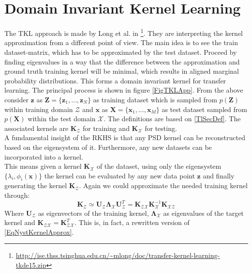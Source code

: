 \section{Domain Invariant Kernel Learning}\label{InSecTrans}
The \ac{TKL} approach is made by Long et al. in  \cite{Long.2015}\footnote{\url{http://ise.thss.tsinghua.edu.cn/~mlong/doc/transfer-kernel-learning-tkde15.zip}}.
They are interpreting the kernel approximation from a different point of view.
The main idea is to see the train dataset-matrix, which has to be approximated by the test dataset. Proceed by finding eigenvalues in a way that the difference between the approximation and ground truth training kernel will be minimal, which results in aligned marginal probability distributions.
This forms a domain invariant kernel for transfer learning.\cite{Long.2015}
The principal process is shown in figure \ref{FigTKLApp}.\newline 
From the above consider $\mathbf{z}$ as $\mathbf{Z}=\{\mathbf{z}_1,\dots,\mathbf{z}_{N}\}$ as training dataset which is sampled from $p(\mathbf{Z})$ within training domain $\mathcal{Z}$ and $\mathbf{x}$ as $\mathbf{X}=\{\mathbf{x}_1,\dots,\mathbf{x}_{M}\}$ as test dataset sampled from $p(\mathbf{X})$ within the test domain $\mathcal{X}$.
The definitions are based on \ref{TlSecDef}.
The associated kernels are $\mathbf{K}_\mathcal{Z}$ for training and $\mathbf{K}_\mathcal{X}$ for testing.\\
A fundamental insight of the \acs{RKHS} is that any \ac{PSD} kernel can be reconstructed based on the eigensystem of it. Furthermore, any new datasets can be incorporated into a kernel.\cite{Long.2015}\\
This means given a kernel $\mathbf{K}_\mathcal{X}$ of the dataset, using only the eigensystem $\{\lambda_i,\phi_i(\mathbf{x})\}$ the kernel can be evaluated by any new data point $\mathbf{z}$ and finally generating the kernel $\mathbf{K}_\mathcal{Z}$.
Again we could approximate the needed training kernel through:\cite{Long.2015}
\begin{equation}\label{EqTrainTestApprox}
	\mathbf{K}_\mathcal{Z} \simeq \mathbf{U}_\mathcal{Z}\boldsymbol{\Lambda}_\mathcal{X} \mathbf{U}_\mathcal{Z}^T = \mathbf{K}_\mathcal{ZX}\mathbf{K}_\mathcal{X}^{-1}\mathbf{K}_\mathcal{XZ}
\end{equation}
Where $\mathbf{U}_\mathcal{Z}$ as eigenvectors of the training kernel, $\boldsymbol{\Lambda}_\mathcal{X}$ as eigenvalues of the target kernel and $\mathbf{K}_\mathcal{ZX} = \mathbf{K}_\mathcal{ZX}^T$.
This is, in fact, a rewritten version of \eqref{EqNystKernelApprox}.\\
